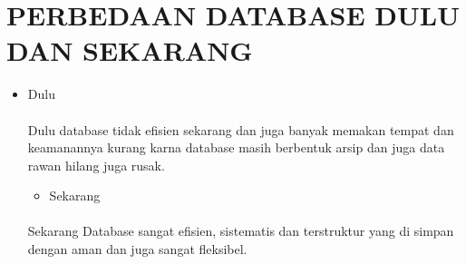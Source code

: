 \documentclass[a4paper,12pt]{article}
\begin{document}
\section{PERBEDAAN DATABASE DULU DAN SEKARANG}
\begin{itemize}
\item Dulu
\paragraph{}
Dulu database tidak efisien sekarang dan juga banyak memakan tempat dan keamanannya kurang karna database masih berbentuk arsip dan juga data rawan hilang juga rusak.
\begin{itemize}
\item Sekarang
\end{itemize}
\paragraph{}
Sekarang Database sangat efisien, sistematis dan terstruktur yang di simpan dengan aman dan juga sangat fleksibel.
\end{itemize}
\end{document}
